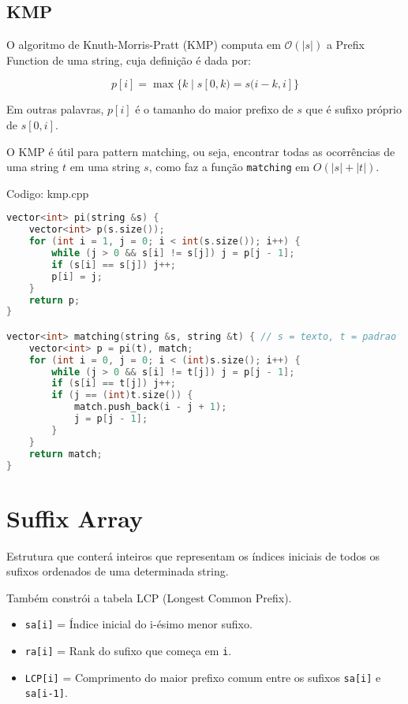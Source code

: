 \documentclass[10pt, a4paper, oneside]{book}
\begin{document}
\subsection{KMP}


O algoritmo de Knuth-Morris-Pratt (KMP) computa em $\mathcal{O}(|s|)$ a Prefix Function de uma string, cuja definição é dada por:



$$ p[i] = \max\{k \mid s[0,k) = s(i-k,i]\} $$



Em outras palavras, $p[i]$ é o tamanho do maior prefixo de $s$ que é sufixo próprio de $s[0,i]$.



O KMP é útil para pattern matching, ou seja, encontrar todas as ocorrências de uma string $t$ em uma string $s$, como faz a função \texttt{matching} em $O(|s| + |t|)$.
\hfill

Codigo: kmp.cpp

\begin{lstlisting}[language=C++]
vector<int> pi(string &s) {
    vector<int> p(s.size());
    for (int i = 1, j = 0; i < int(s.size()); i++) {
        while (j > 0 && s[i] != s[j]) j = p[j - 1];
        if (s[i] == s[j]) j++;
        p[i] = j;
    }
    return p;
}

vector<int> matching(string &s, string &t) { // s = texto, t = padrao
    vector<int> p = pi(t), match;
    for (int i = 0, j = 0; i < (int)s.size(); i++) {
        while (j > 0 && s[i] != t[j]) j = p[j - 1];
        if (s[i] == t[j]) j++;
        if (j == (int)t.size()) {
            match.push_back(i - j + 1);
            j = p[j - 1];
        }
    }
    return match;
}\end{lstlisting}
\hfill

\section{Suffix Array}


Estrutura que conterá inteiros que representam os índices iniciais de todos os sufixos ordenados de uma determinada string.



Também constrói a tabela LCP (Longest Common Prefix).



\begin{itemize}
\item \texttt{sa[i]} = Índice inicial do i-ésimo menor sufixo.
\item \texttt{ra[i]} = Rank do sufixo que começa em \texttt{i}.
\item \texttt{LCP[i]} = Comprimento do maior prefixo comum entre os sufixos \texttt{sa[i]} e \texttt{sa[i-1]}.
\end{itemize}
\end{document}
